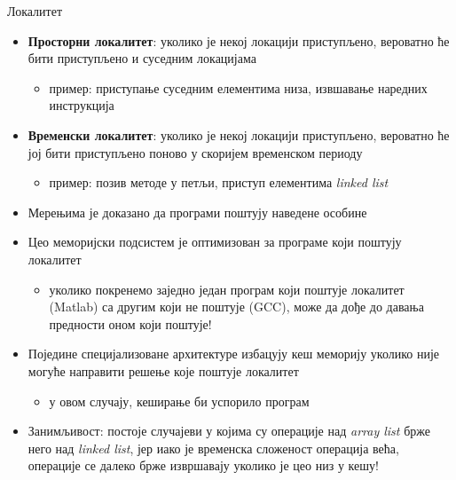 \documentclass[xcolor=table]{beamer}
\begin{document}
    \begin{frame}[allowframebreaks]{Локалитет}
        \begin{itemize}
            \item \textbf{Просторни локалитет}: уколико је некој локацији приступљено, вероватно ће бити приступљено и суседним локацијама
            \begin{itemize}
                \item пример: приступање суседним елементима низа, извшавање наредних инструкција
            \end{itemize}
            \item \textbf{Временски локалитет}: уколико је некој локацији приступљено, вероватно ће јој бити приступљено поново у скоријем временском периоду
            \begin{itemize}
                \item пример: позив методе у петљи, приступ елементима \textit{linked list}
            \end{itemize}
            \item Мерењима је доказано да програми поштују наведене особине
        \end{itemize}
        
        \framebreak

        \begin{itemize} 
            \item Цео меморијски подсистем је оптимизован за програме који поштују локалитет
            \begin{itemize}
                \item уколико покренемо заједно један програм који поштује локалитет (Matlab) са другим који не поштује (GCC), може да дође до давања предности оном који поштује! 
            \end{itemize}
            \item Поједине специјализоване архитектуре избацују кеш меморију уколико није могуће направити решење које поштује локалитет
            \begin{itemize}
                \item у овом случају, кеширање би успорило програм
            \end{itemize}
            \item Занимљивост: постоје случајеви у којима су операције над \textit{array list} брже него над \textit{linked list}, јер иако је временска сложеност операција већа, операције се далеко брже извршавају уколико је цео низ у кешу!
        \end{itemize}
    \end{frame}
    
\end{document}
